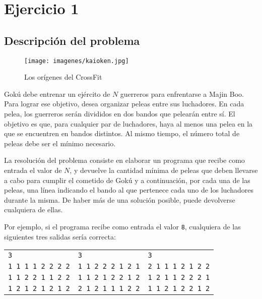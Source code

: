 \section{Ejercicio 1}
    \subsection{Descripción del problema}
		\begin{figure}[ht]
			\begin{center}
				\texttt{[image: imagenes/kaioken.jpg]}
				\caption{Los orígenes del CrossFit}
			\end{center}
		\end{figure}
        Gokú debe entrenar un ejército de $N$ guerreros para enfrentarse a Majin Boo. Para lograr ese objetivo, desea organizar peleas entre sus luchadores. En cada pelea, los guerreros serán divididos en dos bandos que pelearán entre sí. El objetivo es que, para cualquier par de luchadores, haya al menos una pelea en la que se encuentren en bandos distintos. Al mismo tiempo, el número total de peleas debe ser el mínimo necesario.

        La resolución del problema consiste en elaborar un programa que recibe como entrada el valor de $N$, y devuelve la cantidad mínima de peleas que deben llevarse a cabo para cumplir el cometido de Gokú y a continuación, por cada una de las peleas, una línea indicando el bando al que pertenece cada uno de los luchadores durante la misma. De haber más de una solución posible, puede devolverse cualquiera de ellas.

        Por ejemplo, si el programa recibe como entrada el valor \texttt{8}, cualquiera de las siguientes tres salidas sería correcta:

        \begin{center}\begin{tabular}{l @{\hskip 2em} | @{\hskip 2em} l @{\hskip 2em} | @{\hskip 2em} l}
            \texttt{3}               & \texttt{3}  &              \texttt{3}               \\
            \texttt{1 1 1 1 2 2 2 2} & \texttt{1 1 2 2 2 1 2 1} & \texttt{2 1 1 1 2 1 2 2} \\
            \texttt{1 1 2 2 1 1 2 2} & \texttt{1 1 2 1 2 2 1 2} & \texttt{1 2 1 1 2 2 2 1} \\
            \texttt{1 2 1 2 1 2 1 2} & \texttt{2 1 2 1 1 1 2 2} & \texttt{1 1 2 1 2 2 1 2} \\
        \end{tabular}\end{center}

